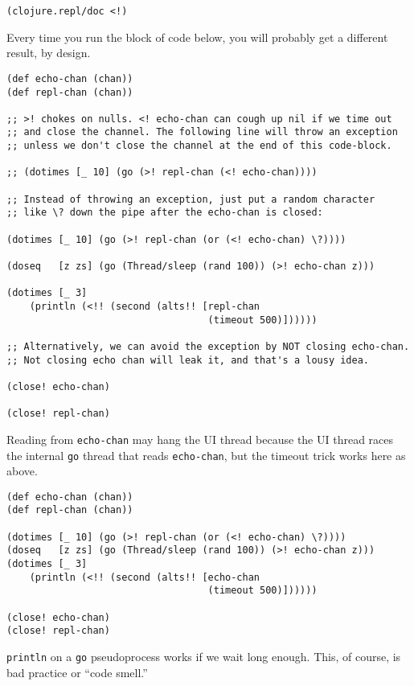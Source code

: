 \documentclass[10pt,oneside,x11names]{article}
\begin{document}
\begin{verbatim}
(clojure.repl/doc <!)
\end{verbatim}

Every time you run the block of code below, you will probably get a different
result, by design.

\begin{verbatim}
(def echo-chan (chan))
(def repl-chan (chan))

;; >! chokes on nulls. <! echo-chan can cough up nil if we time out
;; and close the channel. The following line will throw an exception
;; unless we don't close the channel at the end of this code-block.

;; (dotimes [_ 10] (go (>! repl-chan (<! echo-chan))))

;; Instead of throwing an exception, just put a random character
;; like \? down the pipe after the echo-chan is closed:

(dotimes [_ 10] (go (>! repl-chan (or (<! echo-chan) \?))))

(doseq   [z zs] (go (Thread/sleep (rand 100)) (>! echo-chan z)))

(dotimes [_ 3]
    (println (<!! (second (alts!! [repl-chan
                                   (timeout 500)])))))

;; Alternatively, we can avoid the exception by NOT closing echo-chan.
;; Not closing echo chan will leak it, and that's a lousy idea.

(close! echo-chan)

(close! repl-chan)
\end{verbatim}

Reading from \texttt{echo-chan} may hang the UI thread because the UI thread
races the internal \texttt{go} thread that reads \texttt{echo-chan}, but the timeout trick
works here as above.

\begin{verbatim}
(def echo-chan (chan))
(def repl-chan (chan))

(dotimes [_ 10] (go (>! repl-chan (or (<! echo-chan) \?))))
(doseq   [z zs] (go (Thread/sleep (rand 100)) (>! echo-chan z)))
(dotimes [_ 3]
    (println (<!! (second (alts!! [echo-chan
                                   (timeout 500)])))))

(close! echo-chan)
(close! repl-chan)
\end{verbatim}

\texttt{println} on a \texttt{go} pseudoprocess works if we wait long enough. This, of
course, is bad practice or ``code smell.''
\end{document}
